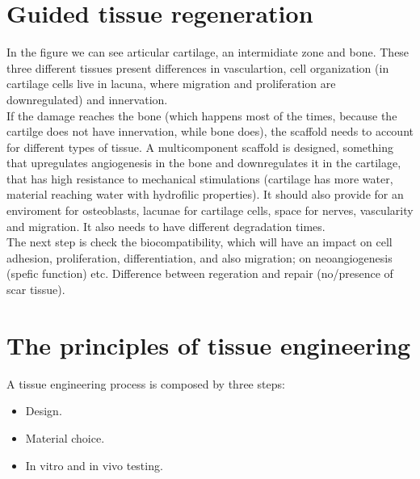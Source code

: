 \section{Guided tissue regeneration}
In the figure we can see articular cartilage, an intermidiate zone and bone. These three different tissues present differences in vasculartion, cell organization (in cartilage cells live in lacuna, where migration and proliferation are downregulated) and innervation.
\\
If the damage reaches the bone (which happens most of the times, because the cartilge does not have innervation, while bone does), the scaffold needs to account for different types of tissue. A multicomponent scaffold is designed, something that upregulates angiogenesis in the bone and downregulates it in the cartilage, that has high resistance to mechanical stimulations (cartilage has more water, material reaching water with hydrofilic properties). It should also provide for an enviroment for osteoblasts, lacunae for cartilage cells, space for nerves, vascularity and migration. It also needs to have different degradation times.
\\
The next step is check the biocompatibility, which will have an impact on cell adhesion, proliferation, differentiation, and also migration; on neoangiogenesis (spefic function) etc. Difference between regeration and repair (no/presence of scar tissue).

\section{The principles of tissue engineering}
A tissue engineering process is composed by three steps:

\begin{multicols}{3}
	\begin{itemize}
		\item Design.
		\item Material choice.
		\item In vitro and in vivo testing.
	\end{itemize}
\end{multicols}

